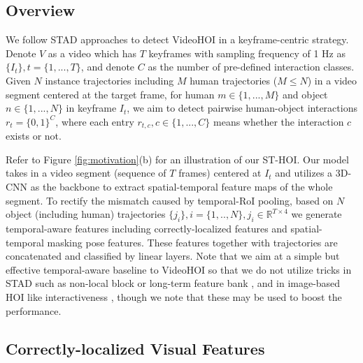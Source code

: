 \documentclass[sigconf]{acmart}
\begin{document}
\subsection{Overview}
\label{subsec:overview}
We follow STAD approaches \cite{tran2015learning,carreira2017quo,feichtenhofer2019slowfast} to detect VideoHOI in a keyframe-centric strategy. 
Denote $V$ as a video which has $T$ keyframes with sampling frequency of 1 Hz as $\{I_t\}, t=\{1,...,T\}$, and denote $C$ as the number of pre-defined interaction classes.
Given $N$ instance trajectories including $M$ human trajectories ($M \leq N$) in a video segment centered at the target frame, for human $m \in \{1,...,M\}$ and object $n \in \{1,...,N\}$ in keyframe $I_t$, we aim to detect pairwise human-object interactions $r_t = \{0,1\}^C$, where each entry $r_{t,c}, c \in \{1,...,C\}$ means whether the interaction $c$ exists or not.

Refer to Figure \ref{fig:motivation}(b) for an illustration of our ST-HOI.
Our model takes in a video segment (sequence of $T$ frames) centered at $I_t$ and utilizes a 3D-CNN as the backbone to extract spatial-temporal feature maps of the whole segment.
To rectify the mismatch caused by temporal-RoI pooling, based on $N$ object (including human) trajectories $\{j_i\}, i=\{1,..,N\}, j_i \in \mathbb{R}^{T \times 4}$ we generate temporal-aware features including correctly-localized features and spatial-temporal masking pose features.
These features together with trajectories are concatenated and classified by linear layers.
Note that we aim at a simple but effective temporal-aware baseline to VideoHOI so that we do not utilize tricks in STAD such as non-local block \cite{wang2018non} or long-term feature bank \cite{wu2019long}, and in image-based HOI like interactiveness \cite{li2019transferable}, though we note that these may be used to boost the performance.


\subsection{Correctly-localized Visual Features}
\label{subsec:temporal_visual_features}
\end{document}
